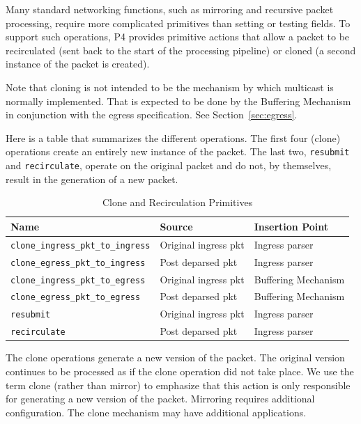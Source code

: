 \documentclass[12pt]{article}
\begin{document}

Many standard networking functions, such as mirroring and recursive packet 
processing, require more complicated primitives than setting or testing fields. 
To support such operations, P4 provides primitive actions that allow a packet 
to be recirculated (sent back to the start of the processing pipeline) or 
cloned (a second instance of the packet is created). 

Note that cloning is not intended to be the mechanism by which multicast is 
normally implemented. That is expected to be done by the Buffering Mechanism 
in conjunction with the egress specification. See Section~\ref{sec:egress}.
 
Here is a table that summarizes the different operations.  The first four 
(clone) operations create an entirely new instance of the packet.  The last 
two, \texttt{resubmit} and \texttt{recirculate}, operate on the original packet and do not, 
by themselves, result in the generation of a new packet.

\begin{table}[H]
\begin{center}
\begin{tabular}{| l | l | l |} \hline
\textbf{Name} &
\textbf{Source} &
\textbf{Insertion Point} \\ \hline
\texttt{clone_ingress_pkt_to_ingress} &
Original ingress pkt &
Ingress parser \\ \hline
\texttt{clone_egress_pkt_to_ingress} &
Post deparsed pkt &
Ingress parser \\ \hline
\texttt{clone_ingress_pkt_to_egress} &
Original ingress pkt &
Buffering Mechanism \\ \hline
\texttt{clone_egress_pkt_to_egress} &
Post deparsed pkt &
Buffering Mechanism \\ \hline
\texttt{resubmit} &
Original ingress pkt &
Ingress parser \\ \hline
\texttt{recirculate} &
Post deparsed pkt &
Ingress parser \\ \hline
\end{tabular}
\end{center}
\caption{Clone and Recirculation Primitives}
\label{tab:clonerecircprimitives}
\end{table}


The clone operations generate a new version of the packet. The original version 
continues to be processed as if the clone operation did not take place. We 
use the term clone (rather than mirror) to emphasize that this action is only 
responsible for generating a new version of the packet. Mirroring requires 
additional configuration. The clone mechanism may have additional applications. 
\end{document}
